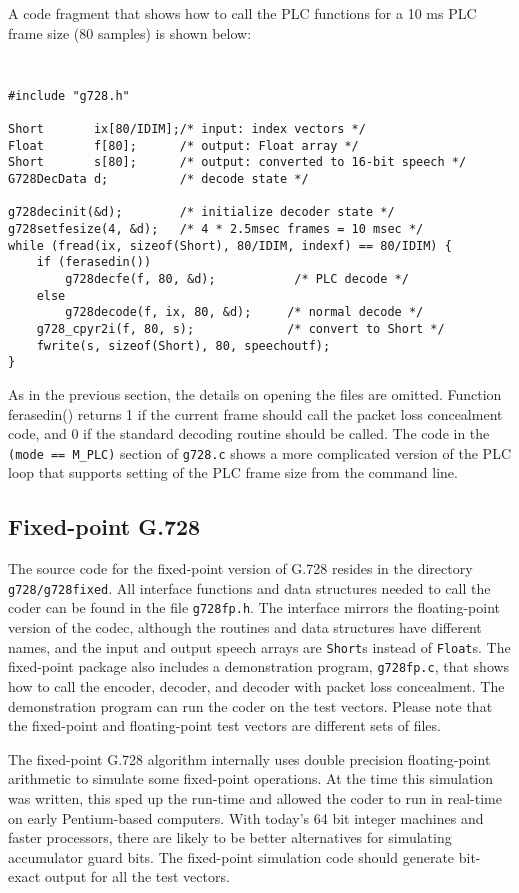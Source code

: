 A code fragment that shows how to call the PLC functions for a 10 ms PLC
frame size (80 samples) is shown below:

{\tt\small
\begin{verbatim}
#include "g728.h"

Short       ix[80/IDIM];/* input: index vectors */
Float       f[80];      /* output: Float array */
Short       s[80];      /* output: converted to 16-bit speech */
G728DecData d;          /* decode state */

g728decinit(&d);        /* initialize decoder state */
g728setfesize(4, &d);   /* 4 * 2.5msec frames = 10 msec */
while (fread(ix, sizeof(Short), 80/IDIM, indexf) == 80/IDIM) {
    if (ferasedin())
        g728decfe(f, 80, &d);           /* PLC decode */
    else
        g728decode(f, ix, 80, &d);     /* normal decode */
    g728_cpyr2i(f, 80, s);             /* convert to Short */
    fwrite(s, sizeof(Short), 80, speechoutf);
}
\end{verbatim}
}

As in the previous section, the details on opening the files are
omitted. Function ferasedin() returns 1 if the current frame should
call the packet loss concealment code, and 0 if the standard decoding
routine should be called. The code in the {\tt (mode == M\_PLC)}
section of {\tt g728.c} shows a more complicated version of the PLC loop
that supports setting of the PLC frame size from the command line.

\subsection {Fixed-point G.728}

The source code for the fixed-point version of G.728 resides in the
directory {\tt g728/g728fixed}. All interface functions and data
structures needed to call the coder can be found in the
file {\tt g728fp.h}. The interface mirrors the floating-point
version of the codec, although the routines and data structures
have different names, and the input and output speech arrays are
{\tt Short}s instead of {\tt Float}s.
The fixed-point package also includes a demonstration program, {\tt g728fp.c},
that shows how to call the encoder, decoder, and decoder with
packet loss concealment. The demonstration program can
run the coder on the test vectors. Please note that the fixed-point and
floating-point test vectors are different sets of files.

The fixed-point G.728 algorithm internally uses double precision floating-point
arithmetic to simulate some fixed-point operations. At the time this simulation
was written, this sped up the run-time and allowed the
coder to run in real-time on early Pentium-based computers. With today's
64 bit integer machines and faster processors, there are likely to be
better alternatives for simulating accumulator guard bits.
The fixed-point simulation code should generate bit-exact output for
all the test vectors.

